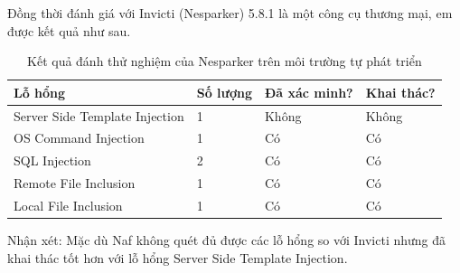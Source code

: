 \documentclass[./../main.tex]{subfiles}
\begin{document}
Đồng thời đánh giá với Invicti (Nesparker) 5.8.1 là một công cụ thương mại,
em được kết quả như sau.
\begin{table}[H]
	\begin{tabular}{|l|l|l|l|}
		\hline
		\textbf{Lỗ hổng}               & \textbf{Số lượng} & \textbf{Đã xác minh?} & \textbf{Khai thác?} \\ \hline
		Server Side Template Injection & 1                 & Không                 & Không               \\ \hline
		OS Command Injection           & 1                 & Có                    & Có                  \\ \hline
		SQL Injection                  & 2                 & Có                    & Có                  \\ \hline
		Remote File Inclusion          & 1                 & Có                    & Có                  \\ \hline
		Local File Inclusion           & 1                 & Có                    & Có                  \\ \hline
	\end{tabular}
	\caption{Kết quả đánh thử nghiệm của Nesparker trên môi trường tự phát triển}

\end{table}

Nhận xét: Mặc dù Naf không quét đủ được các lỗ hổng so với Invicti nhưng đã khai thác tốt hơn với lỗ hổng Server Side Template Injection.






\end{document}
